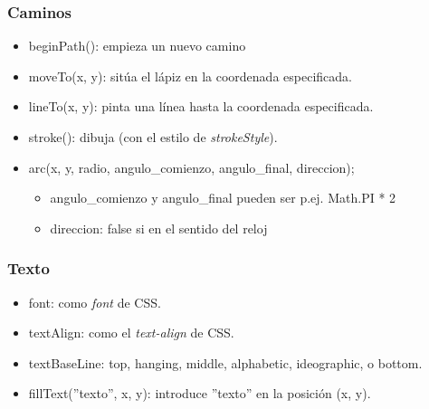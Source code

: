 \begin{frame}
\frametitle{Caminos}

\begin{itemize}
  \item beginPath(): empieza un nuevo camino
  \item moveTo(x, y): sitúa el lápiz en la coordenada especificada.
  \item lineTo(x, y): pinta una línea hasta la coordenada especificada.
  \item stroke(): dibuja (con el estilo de \emph{strokeStyle}).
  \item arc(x, y, radio, angulo\_comienzo, angulo\_final, direccion);
  \begin{itemize}
    \item angulo\_comienzo y angulo\_final pueden ser p.ej. Math.PI * 2
    \item direccion: false si en el sentido del reloj
  \end{itemize}
\end{itemize}

\end{frame}



\begin{frame}
\frametitle{Texto}

\begin{itemize}
  \item font: como \emph{font} de CSS.
  \item textAlign: como el \emph{text-align} de CSS.
  \item textBaseLine: top, hanging, middle, alphabetic, ideographic, o bottom.
  \item fillText(''texto'', x, y): introduce ''texto'' en la posición (x, y).
\end{itemize}

\end{frame}


%
%


